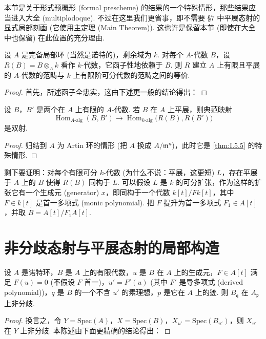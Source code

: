 本节是关于形式预概形 (formal prescheme) 的结果的一个特殊情形，那些结果应当进入大全 (multiplodoque). 不过在这里我们更省事，即不需要 §7 中平展态射的显式局部刻画 (它使用主定理 (Main Theorem)). 这也许是保留本节 (即使在大全中也保留) 在此位置的充分理由.

\begin{theorem}\label{thm:I.6.1}
设 $A$ 是完备局部环 (当然是诺特的)，剩余域为 $k$. 对每个 $A$-代数 $B$，设 $R(B) = B \otimes_A k$ 看作 $k$-代数，它函子性地依赖于 $B$. 则 $R$ 建立 $A$ 上有限且平展的 $A$-代数的范畴与 $k$ 上有限阶可分代数的范畴之间的等价.
\end{theorem}

\begin{proof}
首先，所述函子全忠实，这由下述更一般的结论得出：
\end{proof}

\begin{corollary}\label{cor:I.6.2}
设 $B$，$B'$ 是两个在 $A$ 上有限的 $A$-代数. 若 $B$ 在 $A$ 上平展，则典范映射
\[
\operatorname{Hom}_{A\text{-alg}}(B, B') \longrightarrow \operatorname{Hom}_{k\text{-alg}}\bigl(R(B), R(B')\bigr)
\]
是双射.
\end{corollary}

\begin{proof}
归结到 $A$ 为 Artin 环的情形 (把 $A$ 换成 $A/\mathfrak{m}^n$)，此时它是 \ref{thm:I.5.5} 的特殊情形.
\end{proof}

剩下要证明：对每个有限可分 $k$-代数 (为什么不说：平展，这更短) $L$，存在平展于 $A$ 上的 $B$ 使得 $R(B)$ 同构于 $L$. 可以假设 $L$ 是 $k$ 的可分扩张，作为这样的扩张它有一个生成元 (generator) $x$，即同构于一个代数 $k[t]/Fk[t]$，其中 $F \in k[t]$ 是首一多项式 (monic polynomial). 把 $F$ 提升为首一多项式 $F_1 \in A[t]$，并取 $B = A[t]/F_1 A[t]$.

\section{非分歧态射与平展态射的局部构造}

\begin{proposition}\label{prop:I.7.1}
设 $A$ 是诺特环，$B$ 是 $A$ 上的有限代数，$u$ 是 $B$ 在 $A$ 上的生成元，$F \in A[t]$ 满足 $F(u) = 0$ (不假设 $F$ 首一)，$u' = F'(u)$ (其中 $F'$ 是导多项式 (derived polynomial))，$q$ 是 $B$ 的一个不含 $u'$ 的素理想，$p$ 是它在 $A$ 上的迹. 则 $B_{\mathfrak{q}}$ 在 $A_{\mathfrak{p}}$ 上非分歧.
\end{proposition}

\begin{proof}
换言之，令 $Y = \mathrm{Spec}(A)$，$X = \mathrm{Spec}(B)$，$X_{u'} = \mathrm{Spec}(B_{u'})$，则 $X_{u'}$ 在 $Y$ 上非分歧. 本陈述由下面更精确的结论得出：
\end{proof}

